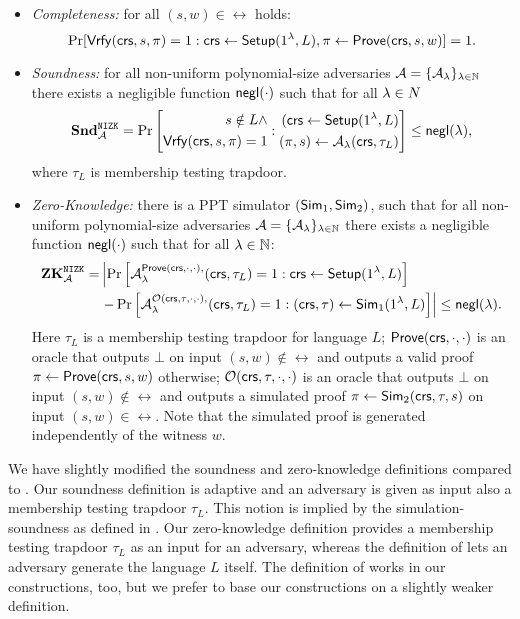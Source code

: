 \begin{definition}
\begin{itemize}
\item \emph{Completeness:}  for all $(s, w) \in \rel$ holds:
\[\Pr[\mathsf{Vrfy}(\mathsf{crs}, s,\pi)=1:\mathsf{crs} \leftarrow \mathsf{Setup}(1{^{\lambda}}, L), \pi \leftarrow \mathsf{Prove}(\mathsf{crs}, s,w)] =1.\] 
\item \emph{Soundness:} for all non-uniform polynomial-size adversaries $\mathcal{A} = \{\mathcal{A}_{\lambda}\}_{\lambda \in \mathbb{N}}$ there exists a negligible function $\mathsf{negl}(\cdot)$ such that for all $\lambda \in N$
\[
\mathbf{Snd}_{\mathcal{A}}^{\mathtt{NIZK}} = \Pr\left[
\begin{aligned}
s \notin L \land \\
\mathsf{Vrfy}(\mathsf{crs}, s, \pi) = 1
\end{aligned}
:
\begin{aligned}
(\mathsf{crs} \leftarrow \mathsf{Setup}(1{^{\lambda}}, L) \\
(\pi, s) \leftarrow \mathcal{A}_{\lambda}(\mathsf{crs}, \tau_L)
\end{aligned} \right] \leq \mathsf{negl}(\lambda),
\]
where $\tau_L$ is membership testing trapdoor. 
\item \emph{Zero-Knowledge:} there is a PPT simulator $(\mathsf{Sim}_1, \mathsf{Sim}_2)$, such that for all non-uniform polynomial-size adversaries $\mathcal{A} = \{\mathcal{A}_{\lambda}\}_{\lambda \in \mathbb{N}}$ there exists a negligible function $\mathsf{negl}(\cdot)$ such that for all $\lambda \in \mathbb{N}$:
\begin{align*}
\mathbf{ZK}_{\mathcal{A}}^{\mathtt{NIZK}} =& 
\left| \Pr\left[ \mathcal{A}_{\lambda}^{\mathsf{Prove}(\mathsf{crs}, \cdot, \cdot),}(\mathsf{crs}, \tau_L) = 1:\mathsf{crs} \leftarrow \mathsf{Setup}(1{^{\lambda}}, L) \right] \right. \\
&\left. - \Pr\left[ \mathcal{A}_{\lambda}^{\mathcal{O}(\mathsf{crs}, \tau, \cdot, \cdot),}(\mathsf{crs}, \tau_L) = 1: (\mathsf{crs}, \tau) \leftarrow \mathsf{Sim}_1(1{^{\lambda}}, L) \right] \right|
\leq \mathsf{negl}(\lambda).
\end{align*}
Here $\tau_L$ is a membership testing trapdoor for language $L$; $\mathsf{Prove}(\mathsf{crs}, \cdot, \cdot)$ is an oracle that outputs $\bot$ on input $(s,w) \notin \rel$ and outputs a valid proof $\pi \leftarrow \mathsf{Prove}(\mathsf{crs}, s, w)$ otherwise; $\mathcal{O}(\mathsf{crs}, \tau, \cdot, \cdot)$ is an oracle that outputs $\bot$ on input $(s,w) \notin \rel$ and outputs a simulated proof $\pi \leftarrow \mathsf{Sim}_2(\mathsf{crs}, \tau, s)$ on input $(s,w) \in \rel$. Note that the simulated proof is generated independently of the witness $w$.
\end{itemize}

\end{definition}

\begin{remark} 
We have slightly modified the soundness and zero-knowledge definitions compared to \cite{Libert2021OneShotFN}. Our soundness definition is adaptive and an adversary is given as input also a membership testing trapdoor $\tau_L$. This notion is implied by the simulation-soundness as defined in . Our zero-knowledge definition provides a membership testing trapdoor $\tau_L$ as an input for an adversary, whereas the definition of \cite{Libert2021OneShotFN} lets an adversary generate the language $L$ itself. The definition of \cite{Libert2021OneShotFN} works in our constructions, too, but we prefer to base our constructions on a slightly weaker definition. 
\end{remark}

